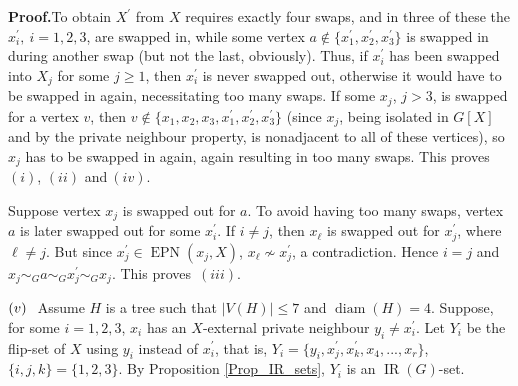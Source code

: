 \documentclass[12pt]{article}%
\begin{document}
\noindent\textbf{Proof.\hspace{0.1in}}To obtain $X^{\prime}$ from $X$ requires
exactly four swaps, and in three of these the $x_{i}^{\prime},\ i=1,2,3$, are
swapped in, while some vertex $a\notin\{x_{1}^{\prime},x_{2}^{\prime}%
,x_{3}^{\prime}\}$ is swapped in during another swap (but not the last,
obviously). Thus, if $x_{i}^{\prime}$ has been swapped into $X_{j}$ for some
$j\geq1$, then $x_{i}^{\prime}$ is never swapped out, otherwise it would have
to be swapped in again, necessitating too many swaps. If some $x_{j}$, $j>3$,
is swapped for a vertex $v$, then $v\notin\{x_{1},x_{2},x_{3},x_{1}^{\prime
},x_{2}^{\prime},x_{3}^{\prime}\}$ (since $x_{j}$, being isolated in $G[X]$
and by the private neighbour property, is nonadjacent to all of these
vertices), so $x_{j}$ has to be swapped in again, again resulting in too many
swaps. This proves $(i)$, $(ii)$ and$~(iv)$.

Suppose vertex $x_{j}$ is swapped out for $a$. To avoid having too many swaps,
vertex $a$ is later swapped out for some $x_{i}^{\prime}$. If $i\neq j$, then
$x_{\ell}$ is swapped out for $x_{j}^{\prime}$, where $\ell\neq j$. But since
$x_{j}^{\prime}\in\operatorname{EPN}(x_{j},X)$, $x_{\ell}\nsim x_{j}^{\prime}%
$, a contradiction. Hence $i=j$ and $x_{j}\sim_{G}a\sim_{G}x_{j}^{\prime}%
\sim_{G}x_{j}$. This proves~$(iii)$.

\noindent$(v)\hspace{0.1in}$Assume $H$ is a tree such that $|V(H)|\leq7$ and
$\operatorname{diam}(H)=4$. Suppose, for some $i=1,2,3$, $x_{i}$ has an
$X$-external private neighbour $y_{i}\neq x_{i}^{\prime}$. Let $Y_{i}$ be the
flip-set of $X$ using $y_{i}$ instead of $x_{i}^{\prime}$, that is,
$Y_{i}=\{y_{i},x_{j}^{\prime},x_{k}^{\prime},x_{4},...,x_{r}\}$,
$\{i,j,k\}=\{1,2,3\}$. By Proposition \ref{Prop_IR_sets}, $Y_{i}$ is an
$\operatorname{IR}(G)$-set.
\end{document}
